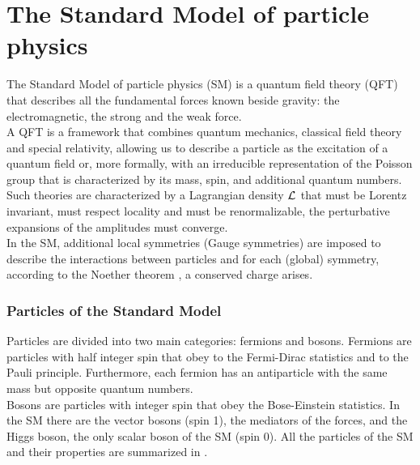 \label{sec:TH}
\minitoc
\section{The Standard Model of particle physics}

The Standard Model of particle physics (SM) is a quantum field theory (QFT) that describes all the fundamental forces known beside gravity: the electromagnetic, the strong and the weak force. \\
A QFT is a framework that combines quantum mechanics, classical field theory and special relativity, allowing us to describe a particle as the excitation of a quantum field or, more formally, with an irreducible representation of the Poisson group that is characterized by its mass, spin, and additional quantum numbers.
Such theories are characterized by a Lagrangian density $\mathcal{L}_\text{}$ that must be Lorentz invariant, must respect locality and must be renormalizable, \ie the perturbative expansions of the amplitudes must converge. \\
In the SM, additional local symmetries (Gauge symmetries) are imposed to describe the interactions between particles and for each (global) symmetry, according to the Noether theorem \cite{NoetherInvarianteVariationsprobleme}, a conserved charge arises.

\subsubsection*{Particles of the Standard Model}
Particles are divided into two main categories: fermions and bosons. 
Fermions are particles with half integer spin that obey to the Fermi-Dirac statistics and to the Pauli principle. 
Furthermore, each fermion has an antiparticle with the same mass but opposite quantum numbers.\\
Bosons are particles with integer spin that obey the Bose-Einstein statistics. In the SM there are the vector bosons (spin 1), the mediators of the forces, and the Higgs boson, the only scalar boson of the SM (spin 0). All the particles of the SM and their properties are summarized in .



